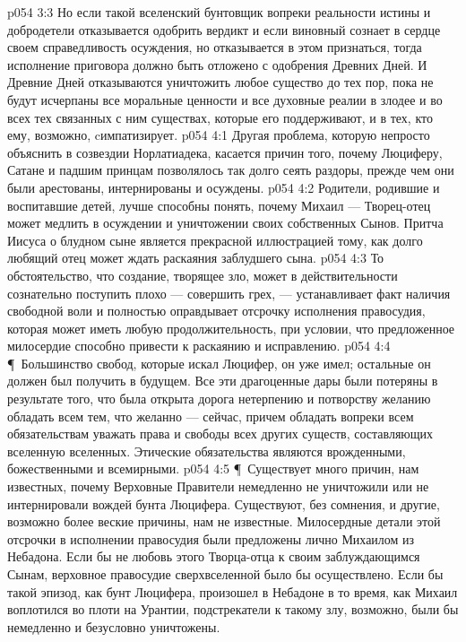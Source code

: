 \vs p054 3:3 Но если такой вселенский бунтовщик вопреки реальности истины и добродетели отказывается одобрить вердикт и если виновный сознает в сердце своем справедливость осуждения, но отказывается в этом признаться, тогда исполнение приговора должно быть отложено с одобрения Древних Дней. И Древние Дней отказываются уничтожить любое существо до тех пор, пока не будут исчерпаны все моральные ценности и все духовные реалии в злодее и во всех тех связанных с ним существах, которые его поддерживают, и в тех, кто ему, возможно, cимпатизирует.
\vs p054 4:1 Другая проблема, которую непросто объяснить в созвездии Норлатиадека, касается причин того, почему Люциферу, Сатане и падшим принцам позволялось так долго сеять раздоры, прежде чем они были арестованы, интернированы и осуждены.
\vs p054 4:2 Родители, родившие и воспитавшие детей, лучше способны понять, почему Михаил --- Творец\hyp{}отец может медлить в осуждении и уничтожении своих собственных Сынов. Притча Иисуса о блудном сыне является прекрасной иллюстрацией тому, как долго любящий отец может ждать раскаяния заблудшего сына.
\vs p054 4:3 То обстоятельство, что создание, творящее зло, может в действительности сознательно поступить плохо --- совершить грех, --- устанавливает факт наличия свободной воли и полностью оправдывает отсрочку исполнения правосудия, которая может иметь любую продолжительность, при условии, что предложенное милосердие способно привести к раскаянию и исправлению.
\vs p054 4:4 \P\ Большинство свобод, которые искал Люцифер, он уже имел; остальные он должен был получить в будущем. Все эти драгоценные дары были потеряны в результате того, что была открыта дорога нетерпению и потворству желанию обладать всем тем, что желанно --- сейчас, причем обладать вопреки всем обязательствам уважать права и свободы всех других существ, составляющих вселенную вселенных. Этические обязательства являются врожденными, божественными и всемирными.
\vs p054 4:5 \P\ Существует много причин, нам известных, почему Верховные Правители немедленно не уничтожили или не интернировали вождей бунта Люцифера. Существуют, без сомнения, и другие, возможно более веские причины, нам не известные. Милосердные детали этой отсрочки в исполнении правосудия были предложены лично Михаилом из Небадона. Если бы не любовь этого Творца\hyp{}отца к своим заблуждающимся Сынам, верховное правосудие сверхвселенной было бы осуществлено. Если бы такой эпизод, как бунт Люцифера, произошел в Небадоне в то время, как Михаил воплотился во плоти на Урантии, подстрекатели к такому злу, возможно, были бы немедленно и безусловно уничтожены.
